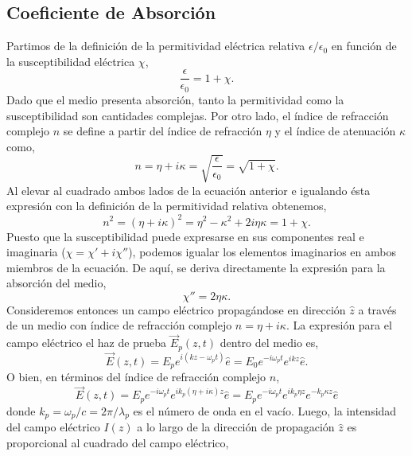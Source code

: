 \subsection{Coeficiente de Absorción}
Partimos de la definición de la permitividad eléctrica relativa $\epsilon / \epsilon_0$ en función de la susceptibilidad eléctrica $\chi$,
\begin{equation}
    \frac{\epsilon}{\epsilon_0} = 1 + \chi.
\end{equation}
Dado que el medio presenta absorción, tanto la permitividad como la susceptibilidad son cantidades complejas. Por otro lado, el índice de refracción complejo $n$ se define a partir del índice de refracción $\eta$ y el índice de atenuación $\kappa$ como,
\begin{equation}
    n = \eta + i \kappa = \sqrt{\frac{\epsilon}{\epsilon_0}} = \sqrt{1 + \chi}.
\end{equation}
Al elevar al cuadrado ambos lados de la ecuación anterior e igualando ésta expresión con la definición de la permitividad relativa obtenemos,
\begin{equation}
    n^2 = (\eta + i \kappa)^2 = \eta^2 - \kappa^2 + 2 i \eta \kappa = 1 + \chi.
\end{equation}
Puesto que la susceptibilidad puede expresarse en sus componentes real e imaginaria ($\chi = \chi' + i \chi''$), podemos igualar los elementos imaginarios en ambos miembros de la ecuación. De aquí, se deriva directamente la expresión para la absorción del medio,
\begin{equation}
    \chi'' = 2 \eta \kappa.
\end{equation}
Consideremos entonces un campo eléctrico propagándose en dirección $\hat{z}$ a través de un medio con índice de refracción complejo $n = \eta + i \kappa$. La expresión para el campo eléctrico el haz de prueba $\vec{E}_p(z,t)$ dentro del medio es,
\begin{equation}
    \vec{E}(z,t) = E_p e^{i(kz - \omega_p t)} \hat{e} = E_0 e^{-i \omega_p t} e^{i k z} \hat{e}.
\end{equation}
O bien, en términos del índice de refracción complejo $n$,
\begin{equation}
    \vec{E}(z,t) = E_p e^{-i \omega_p t} e^{i k_p (\eta + i \kappa) z} \hat{e} = E_p e^{-i \omega_p t} e^{i k_p \eta z} e^{- k_p \kappa z} \hat{e}
\end{equation}
donde $k_p = \omega_p / c = 2 \pi / \lambda_p$ es el número de onda en el vacío. Luego, la intensidad del campo eléctrico $I(z)$ a lo largo de la dirección de propagación $\hat{z}$ es proporcional al cuadrado del campo eléctrico,
